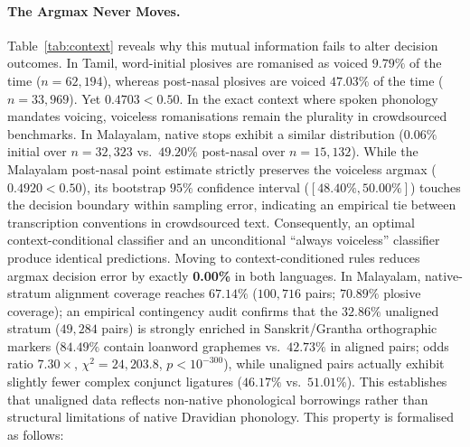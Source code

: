 \documentclass[11pt]{article}
\begin{document}
\paragraph{The Argmax Never Moves.} Table~\ref{tab:context} reveals why this mutual information
fails to alter decision outcomes. In Tamil, word-initial plosives are romanised as voiced $9.79\%$
of the time ($n = 62{,}194$), whereas post-nasal plosives are voiced $47.03\%$ of the time ($n = 33{,}969$).
Yet $0.4703 < 0.50$. In the exact context where spoken phonology mandates voicing, voiceless
romanisations remain the plurality in crowdsourced benchmarks. In Malayalam, native stops exhibit
a similar distribution ($0.06\%$ initial over $n = 32{,}323$ vs.\ $49.20\%$ post-nasal over $n = 15{,}132$).
While the Malayalam post-nasal point estimate strictly preserves the voiceless argmax ($0.4920 < 0.50$),
its bootstrap $95\%$ confidence interval ($[48.40\%, 50.00\%]$) touches the decision boundary within
sampling error, indicating an empirical tie between transcription conventions in crowdsourced text.
Consequently, an optimal context-conditional classifier and an unconditional ``always voiceless''
classifier produce identical predictions. Moving to context-conditioned rules reduces argmax
decision error by exactly \textbf{0.00\%} in both languages. In Malayalam, native-stratum alignment coverage
reaches $67.14\%$ ($100{,}716$ pairs; $70.89\%$ plosive coverage); an empirical contingency audit confirms that the $32.86\%$ unaligned stratum ($49{,}284$ pairs) is strongly enriched in Sanskrit/Grantha orthographic markers ($84.49\%$ contain loanword graphemes vs.\ $42.73\%$ in aligned pairs; odds ratio $7.30\times$, $\chi^2 = 24{,}203.8$, $p < 10^{-300}$), while unaligned pairs actually exhibit slightly fewer complex conjunct ligatures ($46.17\%$ vs.\ $51.01\%$). This establishes that unaligned data reflects non-native phonological borrowings rather than structural limitations of native Dravidian phonology. This property is formalised as follows:
\end{document}
